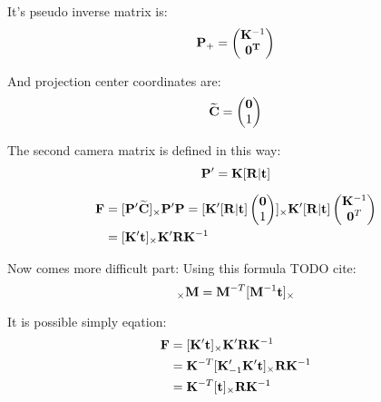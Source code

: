 \documentclass[a4paper,12pt]{report}
\newcommand{\ematr}[1]{
{\bf #1}
}
\newcommand{\evect}[1]{
{\bf #1}
}
\newcommand{\ehvect}[1]{
{\bf \widetilde{#1}}
}
\begin{document}
It's pseudo inverse matrix is:
\begin{equation}
\ematr{P}_{+} =
\begin{pmatrix}
   \ematr{K}^{-1} \\
   \evect{0^{T}} \\
\end{pmatrix}
\end{equation}

And projection center coordinates are:
\begin{equation}
\ehvect{C} =
\begin{pmatrix}
   \evect{0} \\
    1 \\
\end{pmatrix}
\end{equation}


The second camera matrix is defined in this way:
\begin{equation}
\label{eq:rel_or_cam2}
\ematr{P}'  = \ematr{K} \ematr{[}\ematr{R}|\evect{t}\ematr{]}
\end{equation}


\begin{equation}
\begin{split}
\ematr{F}  &= [\ematr{P}'\ehvect{C}]_{\times} \ematr{P}'\ematr{P} 
= [\ematr{K}' [\ematr{R}|\evect{t}]
\begin{pmatrix}
   \evect{0} \\
    1 \\
\end{pmatrix}]
_{\times} 
\ematr{K}' [\ematr{R}|\evect{t}]  
\begin{pmatrix}
   \evect{K}^{-1} \\
   \evect{0}^{T} \\
\end{pmatrix} \\
&= [\ematr{K}' \evect{t}]_{\times} \ematr{K}'\ematr{R}\ematr{K}^{-1} 
\end{split}
\end{equation}

Now comes more difficult part:
Using this formula TODO cite:
\begin{equation}
[\evect{t}]_{\times} \ematr{M} = \ematr{M}^{-T}[\ematr{M}^{-1}\evect{t}]_{\times}
\end{equation}

It is possible simply eqation:
\begin{equation}
\begin{split}
\ematr{F}  &= [\ematr{K}' \evect{t}]_{\times} \ematr{K}' \ematr{R} \ematr{K}^{-1} \\
	   &= \ematr{K}^{-T} [\ematr{K}'_{-1} \ematr{K}' \evect{t}]_{\times} \ematr{R} \ematr{K}^{-1} \\
	   &= \ematr{K}^{-T} [\evect{t}]_{\times} \ematr{R} \ematr{K}^{-1}
\end{split}
\end{equation}
\end{document}
